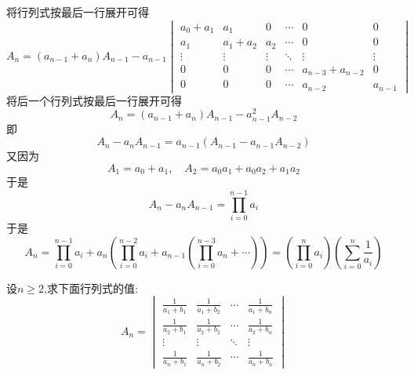\documentclass{ctexart}
\begin{document}
\begin{solution}
    将行列式按最后一行展开可得
    \[A_n=\left(a_{n-1}+a_n\right)A_{n-1}-a_{n-1}\begin{vmatrix}
        a_0+a_1&a_1&0&\cdots&0&0\\
        a_1&a_1+a_2&a_2&\cdots&0&0\\
        \vdots&\vdots&\vdots&\ddots&\vdots&\vdots\\
        0&0&0&\cdots&a_{n-3}+a_{n-2}&0\\
        0&0&0&\cdots&a_{n-2}&a_{n-1}
    \end{vmatrix}\]
    将后一个行列式按最后一行展开可得
    \[A_n=\left(a_{n-1}+a_n\right)A_{n-1}-a_{n-1}^2A_{n-2}\]
    即
    \[A_n-a_nA_{n-1}=a_{n-1}\left(A_{n-1}-a_{n-1}A_{n-2}\right)\]
    又因为
    \[A_1=a_0+a_1,\quad A_2=a_0a_1+a_0a_2+a_1a_2\]
    于是
    \[A_n-a_nA_{n-1}=\prod_{i=0}^{n-1}a_i\]
    于是
    \[A_n=\prod_{i=0}^{n-1}a_i+a_n\left(\prod_{i=0}^{n-2}a_i+a_{n-1}\left(\prod_{i=0}^{n-3}a_n+\cdots\right)\right)=\left(\prod_{i=0}^{n}a_i\right)\left(\sum_{i=0}^{n}\dfrac{1}{a_i}\right)\]
\end{solution}
\begin{problem}
    设$n\geqslant2$,求下面行列式的值:
    \[A_n=\begin{vmatrix}
        \frac{1}{a_1+b_1}&\frac{1}{a_1+b_2}&\cdots&\frac{1}{a_1+b_n}\\
        \frac{1}{a_2+b_1}&\frac{1}{a_2+b_2}&\cdots&\frac{1}{a_2+b_n}\\
        \vdots&\vdots&\ddots&\vdots\\
        \frac{1}{a_n+b_1}&\frac{1}{a_n+b_2}&\cdots&\frac{1}{a_n+b_n}
    \end{vmatrix}\]
\end{problem}
\end{document}
